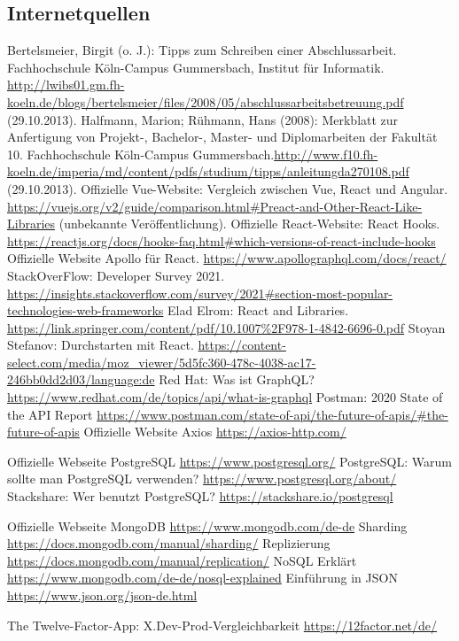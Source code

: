      \subsection{Internetquellen}
     \begin{thebibliography}{HR08} %
       Bertelsmeier, Birgit (o. J.): Tipps zum Schrei\-b\-en ei\-n\-er Ab\-sch\-luss\-ar\-beit. Fach\-hoch\-schu\-le Köln-Campus Gummersbach, Institut für Informatik. \url{http://lwibs01.gm.fh-koeln.de/blogs/bertelsmeier/files/2008/05/abschlussarbeitsbetreuung.pdf} (29.10.2013).
         Halfmann, Marion; Rühmann, Hans (2008): Merkblatt zur Anfertigung von Projekt-, Bachelor-, Master- und Diplomarbeiten der Fakultät 10. Fachhochschule Köln-Campus Gummersbach.\url{http://www.f10.fh-koeln.de/imperia/md/content/pdfs/studium/tipps/anleitungda270108.pdf} (29.10.2013).
         Offizielle Vue-Website: Vergleich zwischen Vue, React und Angular. \url{https://vuejs.org/v2/guide/comparison.html#Preact-and-Other-React-Like-Libraries} (unbekannte Veröffentlichung).
        Offizielle React-Website: React Hooks. \url{https://reactjs.org/docs/hooks-faq.html#which-versions-of-react-include-hooks}
        Offizielle Website Apollo für React. \url{https://www.apollographql.com/docs/react/}
        StackOverFlow: Developer Survey 2021. \url{https://insights.stackoverflow.com/survey/2021#section-most-popular-technologies-web-frameworks}
        Elad Elrom: React and Libraries. \url{https://link.springer.com/content/pdf/10.1007%2F978-1-4842-6696-0.pdf}
        Stoyan Stefanov: Durchstarten mit React. \url{https://content-select.com/media/moz_viewer/5d5fc360-478c-4038-ac17-246bb0dd2d03/language:de}
        Red Hat: Was ist GraphQL? \url{https://www.redhat.com/de/topics/api/what-is-graphql}
        Postman: 2020 State of the API Report \url{https://www.postman.com/state-of-api/the-future-of-apis/#the-future-of-apis}
        Offizielle Website Axios \url{https://axios-http.com/}

        Offizielle Webseite PostgreSQL \url{https://www.postgresql.org/}
        PostgreSQL: Warum sollte man PostgreSQL verwenden? \url{https://www.postgresql.org/about/}
        Stackshare: Wer benutzt PostgreSQL? \url{https://stackshare.io/postgresql}

        Offizielle Webseite MongoDB \url{https://www.mongodb.com/de-de}
        Sharding \url{https://docs.mongodb.com/manual/sharding/}
        Replizierung \url{https://docs.mongodb.com/manual/replication/}
        NoSQL Erklärt \url{https://www.mongodb.com/de-de/nosql-explained}
        Einführung in JSON \url{https://www.json.org/json-de.html}

        The Twelve-Factor-App: X.Dev-Prod-Vergleichbarkeit \url{https://12factor.net/de/}


     \end{thebibliography}